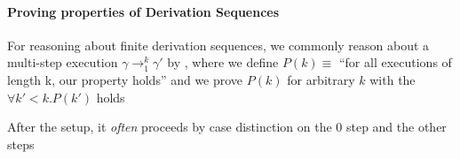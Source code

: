 \paragraph{Proving properties of Derivation Sequences}
For reasoning about finite derivation sequences, we commonly reason about a multi-step execution $\gamma \rightarrow_1^k \gamma'$
by , where we define $P(k) \equiv$ ``for all executions of length k, our property holds'' and we prove $P(k)$ for arbitrary $k$
with the  $\forall k' < k. P(k')$ holds

After the setup, it \textit{often} proceeds by case distinction on the $0$ step and the other steps
